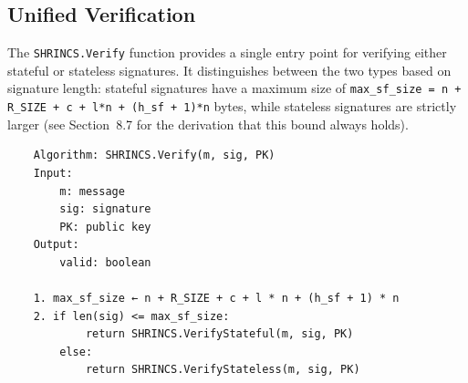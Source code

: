 \subsection{Unified Verification}
The \texttt{SHRINCS.Verify} function provides a single entry point for verifying either stateful or stateless signatures. It distinguishes between the two types based on signature length: stateful signatures have a maximum size of \texttt{max\_sf\_size = n + R\_SIZE + c + l*n + (h\_sf + 1)*n} bytes, while stateless signatures are strictly larger (see Section~8.7 for the derivation that this bound always holds).
\begin{verbatim}
    Algorithm: SHRINCS.Verify(m, sig, PK)
    Input:
        m: message
        sig: signature
        PK: public key
    Output:
        valid: boolean

    1. max_sf_size ← n + R_SIZE + c + l * n + (h_sf + 1) * n
    2. if len(sig) <= max_sf_size:
            return SHRINCS.VerifyStateful(m, sig, PK)
        else:
            return SHRINCS.VerifyStateless(m, sig, PK)
\end{verbatim}